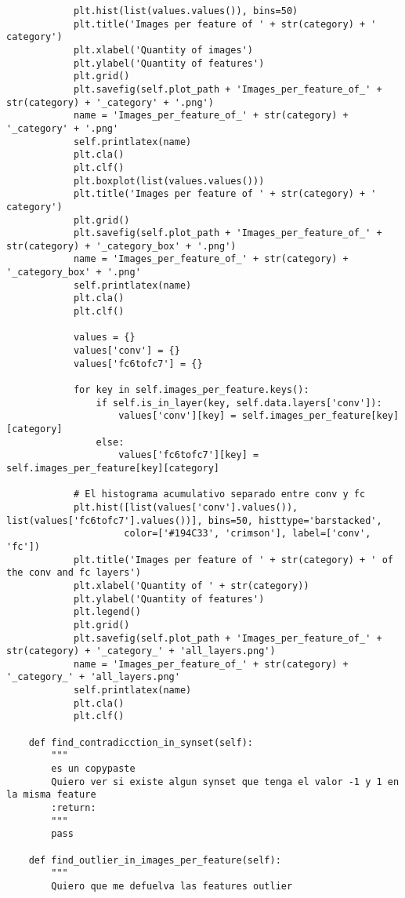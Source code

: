 \documentclass[12,twoside]{TFG-GM}
\theoremstyle{definition}
\theoremstyle{remark}
\begin{document}
\begin{verbatim}
            plt.hist(list(values.values()), bins=50)
            plt.title('Images per feature of ' + str(category) + ' category')
            plt.xlabel('Quantity of images')
            plt.ylabel('Quantity of features')
            plt.grid()
            plt.savefig(self.plot_path + 'Images_per_feature_of_' + str(category) + '_category' + '.png')
            name = 'Images_per_feature_of_' + str(category) + '_category' + '.png'
            self.printlatex(name)
            plt.cla()
            plt.clf()
            plt.boxplot(list(values.values()))
            plt.title('Images per feature of ' + str(category) + ' category')
            plt.grid()
            plt.savefig(self.plot_path + 'Images_per_feature_of_' + str(category) + '_category_box' + '.png')
            name = 'Images_per_feature_of_' + str(category) + '_category_box' + '.png'
            self.printlatex(name)
            plt.cla()
            plt.clf()

            values = {}
            values['conv'] = {}
            values['fc6tofc7'] = {}

            for key in self.images_per_feature.keys():
                if self.is_in_layer(key, self.data.layers['conv']):
                    values['conv'][key] = self.images_per_feature[key][category]
                else:
                    values['fc6tofc7'][key] = self.images_per_feature[key][category]

            # El histograma acumulativo separado entre conv y fc
            plt.hist([list(values['conv'].values()), list(values['fc6tofc7'].values())], bins=50, histtype='barstacked',
                     color=['#194C33', 'crimson'], label=['conv', 'fc'])
            plt.title('Images per feature of ' + str(category) + ' of the conv and fc layers')
            plt.xlabel('Quantity of ' + str(category))
            plt.ylabel('Quantity of features')
            plt.legend()
            plt.grid()
            plt.savefig(self.plot_path + 'Images_per_feature_of_' + str(category) + '_category_' + 'all_layers.png')
            name = 'Images_per_feature_of_' + str(category) + '_category_' + 'all_layers.png'
            self.printlatex(name)
            plt.cla()
            plt.clf()

    def find_contradicction_in_synset(self):
        """
        es un copypaste
        Quiero ver si existe algun synset que tenga el valor -1 y 1 en la misma feature
        :return:
        """
        pass

    def find_outlier_in_images_per_feature(self):
        """
        Quiero que me defuelva las features outlier


\end{verbatim}
\end{document}
